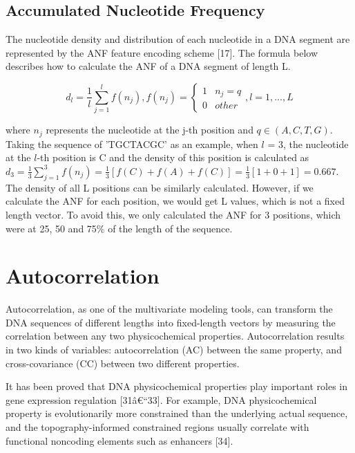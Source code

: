 \subsection{Accumulated Nucleotide Frequency}

The nucleotide density and distribution of each nucleotide in a \gls{DNA} segment are represented by the \gls{ANF} feature encoding scheme [17]. The formula below describes how to calculate the \gls{ANF} of a \gls{DNA} segment of length L.

\begin{equation}\label{eq:ANF}
    d_{l} = \frac{1}{l}\sum_{j=1}^{l}f(n_{j}), f(n_{j}) = \begin{cases}1 & n_{j} = q\\0 & other\end{cases}, l = 1,...,L
\end{equation}

where $n_{j}$ represents the nucleotide at the j-th position and $q \in (A,C,T,G)$. Taking the sequence of 'TGCTACGC' as an example, when $l$ = 3, the nucleotide at the $l$-th position is C and the density of this position is calculated as $d_{3} = \frac{1}{3}\sum_{j=1}^{3}f(n_{j}) = \frac{1}{3} [f(C) + f(A) + f(C)] = \frac{1}{3} [1+0+1] = 0.667$. The density of all L positions can be similarly calculated. However, if we calculate the ANF for each position, we would get L values, which is not a fixed length vector. To avoid this, we only calculated the ANF for 3 positions, which were at 25, 50 and 75\% of the length of the sequence.

\section{Autocorrelation}

Autocorrelation, as one of the multivariate modeling tools, can transform the DNA sequences of different lengths into fixed-length vectors by measuring the correlation between any two physicochemical properties. Autocorrelation results in two kinds of variables: autocorrelation (AC) between the same property, and cross-covariance (CC) between two different properties.

It has been proved that DNA physicochemical properties play important roles in gene expression regulation [31â€“33]. For example, DNA physicochemical property is evolutionarily more constrained than the underlying actual sequence, and the topography-informed constrained regions usually correlate with functional noncoding elements such as enhancers [34].

